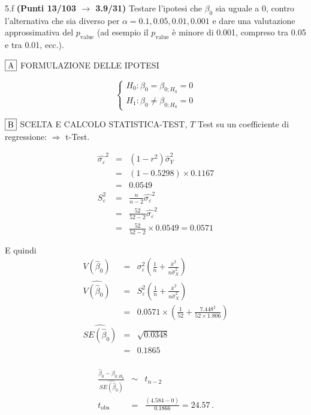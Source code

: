 \documentclass[
  11pt,
]{book}
\theoremstyle{mytheoremstyle}
\theoremstyle{mydefstyle}
\begin{document}
5.f \textbf{(Punti 13/103 \(\rightarrow\) 3.9/31)} Testare l'ipotesi che \(\beta_0\) sia uguale a 0, contro l'alternativa che sia diverso per \(\alpha=0.1,0.05,0.01,0.001\) e dare una valutazione approssimativa del \(p_\text{value}\) (ad esempio il \(p_\text{value}\) è minore di 0.001, compreso tra 0.05 e tra 0.01, ecc.).

\(\fbox{A}\) FORMULAZIONE DELLE IPOTESI

\[\begin{cases}
   H_0: \beta_0 = \beta_{0;H_0}=0 \\
   H_1: \beta_0 \neq \beta_{0;H_0}=0 
   \end{cases}\]

\(\fbox{B}\) SCELTA E CALCOLO STATISTICA-TEST, \(T\)
Test su un coefficiente di regressione: \(\Rightarrow\) t-Test.

\begin{eqnarray*}
\hat{\sigma_\varepsilon}^2&=&(1-r^2)\hat\sigma_Y^2\\
&=& (1- 0.5298 )\times 0.1167 \\
   &=&  0.0549 \\
   S_\varepsilon^2 &=& \frac{n} {n-2} \hat{\sigma_\varepsilon}^2\\
   &=&  \frac{ 52 } { 52 -2} \hat{\sigma_\varepsilon}^2 \\
 &=&  \frac{ 52 } { 52 -2} \times  0.0549  =  0.0571  
\end{eqnarray*}

E quindi\begin{eqnarray*}
V(\hat\beta_{0}) &=& \sigma_{\varepsilon}^{2} \left( \frac{1} {n}  +  \frac{\bar{x}^{2}} {n \hat{\sigma}^{2}_{X}} \right)\\
\widehat{V(\hat\beta_{0})} &=& S_{\varepsilon}^{2}\left( \frac{1} {n}  +  \frac{\bar{x}^{2}} {n \hat{\sigma}^{2}_{X}} \right)\ \\
 &=&  0.0571 \times\left( \frac{1} { 52 }  +  \frac{ 7.448 ^{2}} { 52 \times  1.806 } \right)\\
 \widehat{SE(\hat\beta_{0})}        &=&  \sqrt{ 0.0348 }\\
 &=&  0.1865 
\end{eqnarray*}\\
\begin{eqnarray*}
 \frac{\hat\beta_{ 0 } - \beta_{ 0 ;H_0}} {\widehat{SE(\hat\beta_{ 0 })}}&\sim&t_{n-2}\\
   t_{\text{obs}}
&=& \frac{ ( 4.584 -  0 )} { 0.1866 }
 =   24.57 \, .
\end{eqnarray*}
\end{document}
